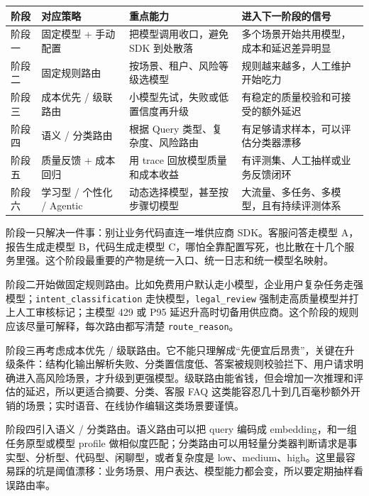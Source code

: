 \documentclass[9pt,a4paper,twocolumn]{ctexart}
\begin{document}
{\footnotesize
\begin{tabular}{|p{}|p{}|p{}|p{}|}
\hline
\textbf{阶段} & \textbf{对应策略} & \textbf{重点能力} & \textbf{进入下一阶段的信号} \\
\hline
阶段一 & 固定模型 + 手动配置 & 把模型调用收口，避免 SDK 到处散落 & 多个场景开始共用模型，成本和延迟差异明显 \\
\hline
阶段二 & 固定规则路由 & 按场景、租户、风险等级选模型 & 规则越来越多，人工维护开始吃力 \\
\hline
阶段三 & 成本优先 / 级联路由 & 小模型先试，失败或低置信度再升级 & 有稳定的质量校验和可接受的额外延迟 \\
\hline
阶段四 & 语义 / 分类路由 & 根据 Query 类型、复杂度、风险路由 & 有足够请求样本，可以评估分类器漂移 \\
\hline
阶段五 & 质量反馈 + 成本回归 & 用 trace 回放模型质量和成本收益 & 有评测集、人工抽样或业务反馈闭环 \\
\hline
阶段六 & 学习型 / 个性化 / Agentic & 动态选择模型，甚至按步骤切模型 & 大流量、多任务、多模型，且有持续评测体系 \\
\hline
\end{tabular}
}



阶段一只解决一件事：别让业务代码直连一堆供应商 SDK。客服问答走模型 A，报告生成走模型 B，代码生成走模型 C，哪怕全靠配置写死，也比散在十几个服务里强。这个阶段最重要的产物是统一入口、统一日志和统一模型名映射。



阶段二开始做固定规则路由。比如免费用户默认走小模型，企业用户复杂任务走强模型；\texttt{intent\_classification} 走快模型，\texttt{legal\_review} 强制走高质量模型并打上人工审核标记；主模型 429 或 P95 延迟升高时切备用供应商。这个阶段的规则应该尽量可解释，每次路由都写清楚 \texttt{route\_reason}。



阶段三再考虑成本优先 / 级联路由。它不能只理解成“先便宜后昂贵”，关键在升级条件：结构化输出解析失败、分类置信度低、答案被规则校验拦下、用户请求明确进入高风险场景，才升级到更强模型。级联路由能省钱，但会增加一次推理和评估的延迟，所以更适合摘要、分类、客服 FAQ 这类能容忍几十到几百毫秒额外开销的场景；实时语音、在线协作编辑这类场景要谨慎。



阶段四引入语义 / 分类路由。语义路由可以把 query 编码成 embedding，和一组任务原型或模型 profile 做相似度匹配；分类路由可以用轻量分类器判断请求是事实型、分析型、代码型、闲聊型，或者复杂度是 low、medium、high。这里最容易踩的坑是阈值漂移：业务场景、用户表达、模型能力都会变，所以要定期抽样看误路由率。
\end{document}
